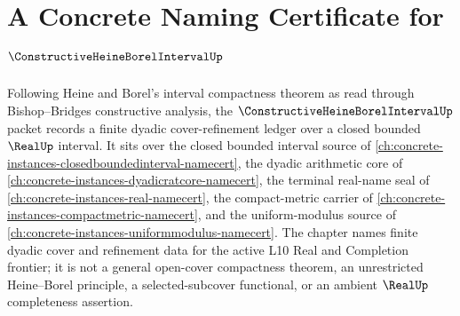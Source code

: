 \chapter{A Concrete Naming Certificate for $\ConstructiveHeineBorelIntervalUp$}
\label{ch:concrete-instances-constructive-heine-borel-interval-namecert}

Following Heine and Borel's interval compactness theorem as read through Bishop--Bridges constructive analysis, the $\ConstructiveHeineBorelIntervalUp$ packet records a finite dyadic cover-refinement ledger over a closed bounded $\RealUp$ interval. It sits over the closed bounded interval source of \autoref{ch:concrete-instances-closedboundedinterval-namecert}, the dyadic arithmetic core of \autoref{ch:concrete-instances-dyadicratcore-namecert}, the terminal real-name seal of \autoref{ch:concrete-instances-real-namecert}, the compact-metric carrier of \autoref{ch:concrete-instances-compactmetric-namecert}, and the uniform-modulus source of \autoref{ch:concrete-instances-uniformmodulus-namecert}. The chapter names finite dyadic cover and refinement data for the active L10 Real and Completion frontier; it is not a general open-cover compactness theorem, an unrestricted Heine--Borel principle, a selected-subcover functional, or an ambient $\RealUp$ completeness assertion.


